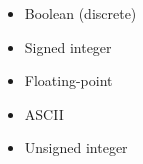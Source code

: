 \begin{itemize}
\item{} Boolean (discrete)
\vskip 5pt 
\item{} Signed integer 
\vskip 5pt 
\item{} Floating-point 
\vskip 5pt 
\item{} ASCII
\vskip 5pt 
\item{} Unsigned integer 
\end{itemize}




